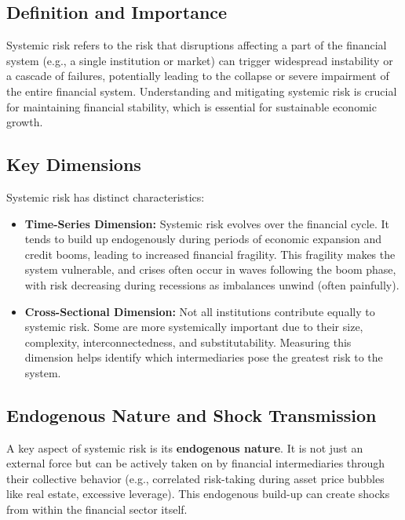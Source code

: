 \newpage


\subsection{Definition and Importance}
Systemic risk refers to the risk that disruptions affecting a part of the financial system (e.g., a single institution or market) can trigger widespread instability or a cascade of failures, potentially leading to the collapse or severe impairment of the entire financial system. Understanding and mitigating systemic risk is crucial for maintaining financial stability, which is essential for sustainable economic growth.

\subsection{Key Dimensions}
Systemic risk has distinct characteristics:
\begin{itemize}
    \item \textbf{Time-Series Dimension:} Systemic risk evolves over the financial cycle. It tends to build up endogenously during periods of economic expansion and credit booms, leading to increased financial fragility. This fragility makes the system vulnerable, and crises often occur in waves following the boom phase, with risk decreasing during recessions as imbalances unwind (often painfully).
    \item \textbf{Cross-Sectional Dimension:} Not all institutions contribute equally to systemic risk. Some are more systemically important due to their size, complexity, interconnectedness, and substitutability. Measuring this dimension helps identify which intermediaries pose the greatest risk to the system.
\end{itemize}

\subsection{Endogenous Nature and Shock Transmission}
A key aspect of systemic risk is its \textbf{endogenous nature}. It is not just an external force but can be actively taken on by financial intermediaries through their collective behavior (e.g., correlated risk-taking during asset price bubbles like real estate, excessive leverage). This endogenous build-up can create shocks from within the financial sector itself.

